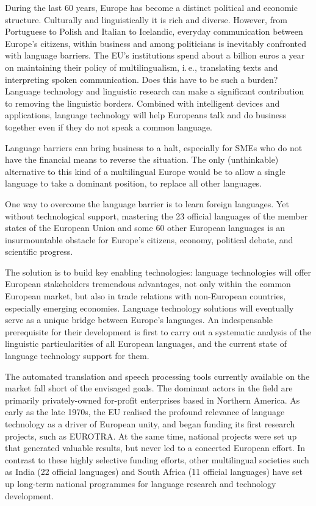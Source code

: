 \documentclass[]{../../metanetpaper}
\begin{document}
\begin{multicols}{2}

During the last 60 years, Europe has become a distinct political and economic structure. Culturally and linguistically it is rich and diverse. However, from Portuguese to Polish and Italian to Icelandic, everyday communication between Europe’s citizens, within business and among politicians is inevitably confronted with language barriers. The EU's institutions spend about a billion euros a year on maintaining their policy of multilingualism, i.\,e., translating texts and interpreting spoken communication. Does this have to be such a burden? Language technology and linguistic research can make a significant contribution to removing the linguistic borders. Combined with intelligent devices and applications, language technology will help Europeans talk and do business together even if they do not speak a common language. 


Language barriers can bring business to a halt, especially for SMEs who do not have the financial means to reverse the situation. The only (unthinkable) alternative to this kind of a multilingual Europe would be to allow a single language to take a dominant position, to replace all other languages. 

One way to overcome the language barrier is to learn foreign languages. Yet without technological support, mastering the 23 official languages of the member states of the European Union and some 60 other European languages is an insurmountable obstacle for Europe’s citizens, economy, political debate, and scientific progress. 

The solution is to build key enabling technologies: language technologies will offer European stakeholders tremendous advantages, not only within the common European market, but also in trade relations with non-European countries, especially emerging economies. Language technology solutions will eventually serve as a unique bridge between Europe's languages. An indespensable prerequisite for their development is first to carry out a systematic analysis of the linguistic particularities of all European languages, and the current state of language technology support for them.  
    
The automated translation and speech processing tools currently available on the market fall short of the envisaged goals. The dominant actors in the field are primarily privately-owned for-profit enterprises based in Northern America. As early as the late 1970s, the EU realised the profound relevance of language technology as a driver of European unity, and began funding its first research projects, such as EUROTRA. At the same time, national projects were set up that generated valuable results, but never led to a concerted European effort. In contrast to these highly selective funding efforts, other multilingual societies such as India (22 official languages) and South Africa (11 official languages) have set up long-term national programmes for language research and technology development. 


\end{multicols}
\end{document}
